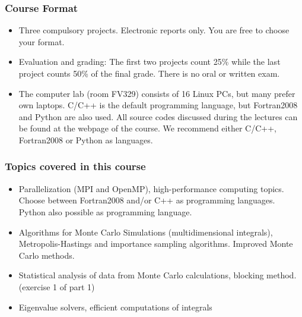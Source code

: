 \documentclass{beamer}
\begin{document}
\begin{frame}
\frametitle{Course Format}

\begin{block}{}
\begin{itemize}
  \item Three  compulsory projects. Electronic reports only. You are free to choose your format.

  \item Evaluation and grading: The first two projects count 25\% while the last project counts 50\% of the final grade. There is no oral or written exam.

  \item The computer lab (room FV329) consists of 16 Linux PCs, but many prefer own laptops. C/C++ is the default programming language, but Fortran2008 and Python are also used. All source codes discussed during the lectures can be found at the webpage of the course. We recommend either C/C++, Fortran2008 or Python as languages.
\end{itemize}

\noindent
\end{block}
\end{frame}

\begin{frame}
\frametitle{Topics covered in this course}

\begin{block}{}
\begin{itemize}
  \item Parallelization (MPI and OpenMP), high-performance computing topics. Choose between Fortran2008 and/or C++ as programming languages. Python also possible as programming language. 

  \item Algorithms for Monte Carlo Simulations (multidimensional integrals), Metropolis-Hastings and importance sampling algorithms.  Improved Monte Carlo methods.

  \item Statistical analysis of data  from Monte Carlo calculations, blocking method. (exercise 1 of part 1)

  \item Eigenvalue solvers, efficient computations of integrals
\end{itemize}

\noindent
\end{block}
\end{frame}
\end{document}
